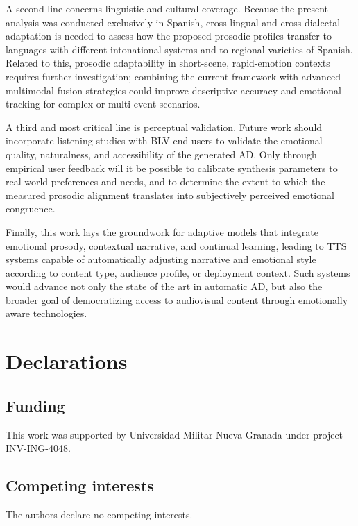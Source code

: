 \documentclass[pdflatex,iicol,sn-mathphys-num]{sn-jnl}%
\theoremstyle{thmstyleone}%
\theoremstyle{thmstyletwo}%
\theoremstyle{thmstylethree}%
\begin{document}
A second line concerns linguistic and cultural coverage. Because the present analysis was conducted exclusively in Spanish, cross-lingual and cross-dialectal adaptation is needed to assess how the proposed prosodic profiles transfer to languages with different intonational systems and to regional varieties of Spanish. Related to this, prosodic adaptability in short-scene, rapid-emotion contexts requires further investigation; combining the current framework with advanced multimodal fusion strategies could improve descriptive accuracy and emotional tracking for complex or multi-event scenarios.

A third and most critical line is perceptual validation. Future work should incorporate listening studies with BLV end users to validate the emotional quality, naturalness, and accessibility of the generated AD. Only through empirical user feedback will it be possible to calibrate synthesis parameters to real-world preferences and needs, and to determine the extent to which the measured prosodic alignment translates into subjectively perceived emotional congruence.

Finally, this work lays the groundwork for adaptive models that integrate emotional prosody, contextual narrative, and continual learning, leading to TTS systems capable of automatically adjusting narrative and emotional style according to content type, audience profile, or deployment context. Such systems would advance not only the state of the art in automatic AD, but also the broader goal of democratizing access to audiovisual content through emotionally aware technologies.

\section*{Declarations}

\subsection*{Funding}
This work was supported by Universidad Militar Nueva Granada under project INV-ING-4048.

\subsection*{Competing interests}
The authors declare no competing interests.
\end{document}
